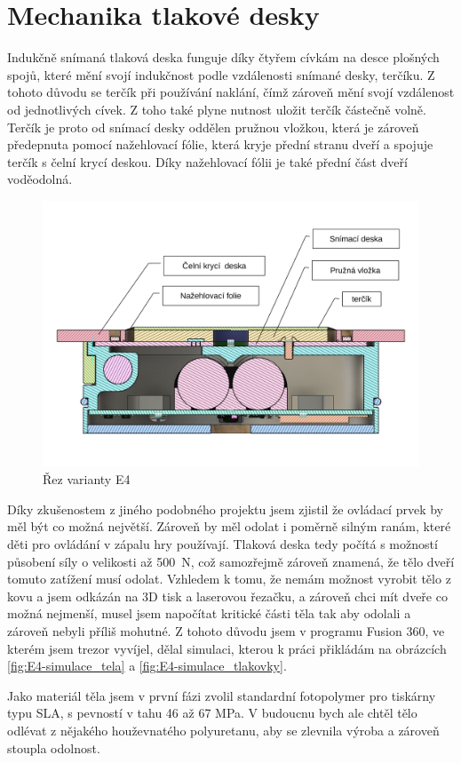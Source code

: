 \section{Mechanika tlakové desky}

Indukčně snímaná tlaková deska funguje díky čtyřem cívkám na desce plošných spojů, které mění svojí indukčnost podle vzdálenosti snímané desky, terčíku.
Z tohoto důvodu se terčík při používání naklání, čímž zároveň mění svojí vzdálenost od jednotlivých cívek. Z toho také plyne nutnost uložit terčík
částečně volně. Terčík je proto od snímací desky oddělen pružnou vložkou, která je zároveň předepnuta pomocí nažehlovací fólie, která kryje přední 
stranu dveří a spojuje terčík s čelní krycí deskou. Díky nažehlovací fólii je také přední část dveří voděodolná.

\begin{figure}[htbp]
    \centering
    \includegraphics[width=\textwidth]{kapitoly/obrazky/E4/machanika_tlakove_desky/rez_po_ose.pdf}
    \caption{Řez varianty E4}
    \label{fig:E4-rez}
\end{figure}

Díky zkušenostem z jiného podobného projektu jsem zjistil že ovládací prvek by měl být co možná největší. 
Zároveň by měl odolat i poměrně silným ranám, které děti pro ovládání v zápalu hry používají.
Tlaková deska tedy počítá s možností působení síly o velikosti až 500~N, což samozřejmě zároveň znamená, že tělo dveří tomuto zatížení musí odolat.
Vzhledem k tomu, že nemám možnost vyrobit tělo z kovu a jsem odkázán na 3D tisk a laserovou řezačku, a zároveň chci mít dveře co možná nejmenší,
musel jsem napočítat kritické části těla tak aby odolali a zároveň nebyli příliš mohutné. Z tohoto důvodu jsem v programu Fusion 360, ve kterém jsem trezor vyvíjel,
dělal simulaci, kterou k práci přikládám na obrázcích \ref{fig:E4-simulace_tela} a \ref{fig:E4-simulace_tlakovky}. %

Jako materiál těla jsem v první fázi zvolil standardní fotopolymer pro tiskárny typu SLA, s pevností v tahu 46 až 67 MPa.
V budoucnu bych ale chtěl tělo odlévat z nějakého houževnatého polyuretanu, aby se zlevnila výroba a zároveň stoupla odolnost.

\newpage